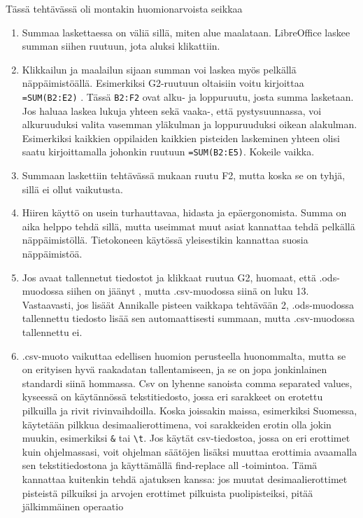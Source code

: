 \documentclass[12pt,leqno,a4paper,oneside]{amsart}
\theoremstyle{definition}
\theoremstyle{remark}
\numberwithin{equation}{section}
\begin{document}
Tässä tehtävässä oli montakin huomionarvoista seikkaa
\begin{enumerate}
 \item 
 Summaa laskettaessa on väliä sillä, miten alue maalataan. LibreOffice laskee summan siihen ruutuun, jota aluksi klikattiin.
 \item
 Klikkailun ja maalailun sijaan summan voi laskea myös pelkällä näppäimistöällä. Esimerkiksi G2-ruutuun oltaisiin voitu kirjoittaa
 \texttt{=SUM(B2:E2)} . Tässä \texttt{B2:F2} ovat alku- ja loppuruutu, josta summa lasketaan. Jos haluaa laskea lukuja yhteen sekä
 vaaka-, että pystysuunnassa, voi alkuruuduksi valita vasemman yläkulman ja loppuruuduksi oikean alakulman. Esimerkiksi kaikkien
 oppilaiden kaikkien pisteiden laskeminen yhteen olisi saatu kirjoittamalla johonkin ruutuun \texttt{=SUM(B2:E5)}. Kokeile vaikka.
 \item
 Summaan laskettiin tehtävässä mukaan ruutu F2, mutta koska se on tyhjä, sillä ei ollut vaikutusta.
 \item
 Hiiren käyttö on usein turhauttavaa, hidasta ja epäergonomista. Summa on aika helppo tehdä sillä, mutta useimmat muut asiat kannattaa
 tehdä pelkällä näppäimistöllä. Tietokoneen käytössä yleisestikin kannattaa suosia näppäimistöä.
 \item
 Jos avaat tallennetut tiedostot ja klikkaat ruutua G2, huomaat, että .ods-muodossa siihen on jäänyt , mutta .csv-muodossa
 siinä on luku 13. Vastaavasti, jos lisäät Annikalle pisteen vaikkapa tehtävään 2, .ods-muodossa tallennettu tiedosto lisää sen automaattisesti 
 summaan, mutta .csv-muodossa tallennettu ei. 
 \item
 .csv-muoto vaikuttaa edellisen huomion perusteella huonommalta, mutta se on erityisen hyvä raakadatan tallentamiseen, ja se on jopa jonkinlainen
 standardi siinä hommassa. Csv on lyhenne sanoista comma separated values, kyseessä on käy\-tän\-nös\-sä tekstitiedosto, jossa eri sarakkeet on 
 erotettu pilkuilla ja rivit rivinvaihdoilla. Koska joissakin maissa, esimerkiksi Suomessa, käytetään pilkkua desimaali\-erottimena, voi sarakkeiden
 erotin olla jokin muukin, esimerkiksi \texttt{\&} tai \texttt{\textbackslash t}. Jos käytät csv-tiedostoa, jossa on eri erottimet kuin ohjelmassasi,
 voit ohjelman säätöjen lisäksi muuttaa erottimia avaamalla sen tekstitiedostona ja käyt\-tä\-mäl\-lä find-replace all -toimintoa. Tämä kannattaa kuitenkin
 tehdä ajatuksen kanssa: jos muutat desimaalierottimet pisteistä pilkuiksi ja arvojen erottimet pilkuista puolipisteiksi, pitää jäl\-kim\-mäi\-nen operaatio

\end{enumerate}
\end{document}
